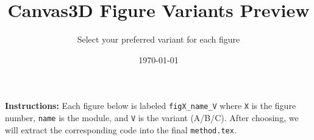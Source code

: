 \documentclass[10pt,twocolumn]{article}
\begin{document}
\title{Canvas3D Figure Variants Preview}
\author{Select your preferred variant for each figure}
\date{\today}
\maketitle

\vspace{1em}
\noindent\textbf{Instructions:} Each figure below is labeled
\texttt{figX\_name\_V} where \texttt{X} is the figure number,
\texttt{name} is the module, and \texttt{V} is the variant (A/B/C).
After choosing, we will extract the corresponding code into the final
\texttt{method.tex}.

\clearpage

\clearpage

\clearpage

\clearpage

\clearpage

\end{document}
